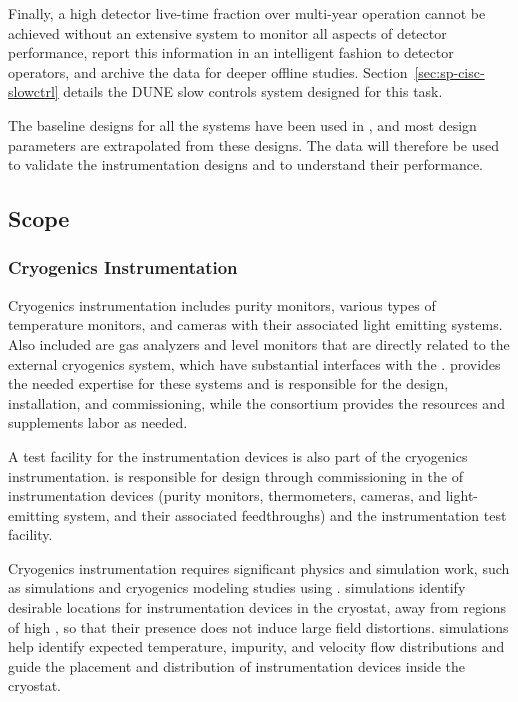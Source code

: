 Finally, a high detector live-time fraction over multi-year operation cannot be achieved without an extensive system to monitor all aspects of detector performance, report this information in an intelligent fashion to detector operators, and archive the data for deeper offline studies.  Section~\ref{sec:sp-cisc-slowctrl} details the DUNE slow controls system designed for this task.
 
The baseline designs for all the  systems have been used in , %
and most design
parameters are extrapolated from these designs. The  data will therefore be used to validate the instrumentation designs and to understand their performance.

\subsection{Scope}

\subsubsection{Cryogenics Instrumentation}
Cryogenics instrumentation includes purity monitors,  various types of temperature monitors, and cameras with their associated light emitting systems. Also included are %
gas analyzers and \lar level monitors that are directly related to the external cryogenics system, which have substantial interfaces with the .  provides the needed expertise  for these systems and is responsible for the design, installation, and commissioning, while the  consortium provides the resources and supplements labor as needed. 

A test facility for the instrumentation devices is also part of the cryogenics instrumentation.
  is responsible for design through commissioning in the  %
of \lar instrumentation devices (purity monitors, thermometers, cameras, and light-emitting system, and their associated feedthroughs) and the instrumentation test facility.

Cryogenics instrumentation %
requires significant physics and
simulation work, such as \efield simulations and cryogenics modeling
studies using . \efield simulations
identify desirable locations for instrumentation
devices in the cryostat, away from %
regions of high \efield, so that %
their presence does not induce large field distortions. 
 simulations help identify %
expected temperature, impurity, and velocity flow distributions and guide the placement and distribution of instrumentation devices inside the cryostat.

